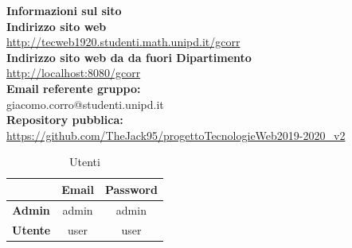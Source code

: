 \begin{center}
	\textbf{\Large{Informazioni sul sito}}\\
	\textbf{Indirizzo sito web} \\ \url{http://tecweb1920.studenti.math.unipd.it/gcorr}\\
	\textbf{Indirizzo sito web da da fuori Dipartimento} \\ \url{http://localhost:8080/gcorr}\\
	\textbf{Email referente gruppo:} \\ giacomo.corro@studenti.unipd.it \\
	\textbf{Repository pubblica:} \\ \url{https://github.com/TheJack95/progettoTecnologieWeb2019-2020_v2}\\
	\renewcommand{\arraystretch}{1.8}
	\begin{longtable}[H]{c c c}
		\caption{Utenti}\\
		\rowcolor[HTML]{F1AB00}
		\multicolumn{1}{c}{\color[HTML]{FFFFFF} \textbf{Utente}} &
		\multicolumn{1}{c}{\color[HTML]{FFFFFF} \textbf{Email}} &
		\multicolumn{1}{c}{\color[HTML]{FFFFFF} \textbf{Password}} \\
		\endhead
		\textbf{Admin} & admin & admin\\
		\textbf{Utente} & user & user\\
	\end{longtable}
\end{center}
